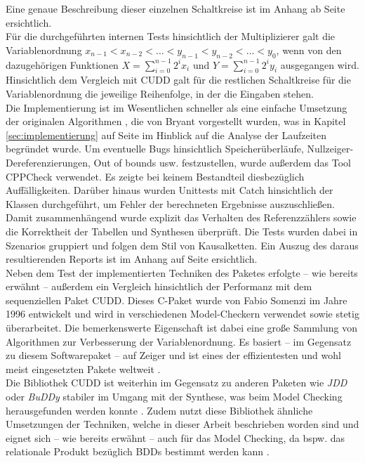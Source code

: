 \noindent 
Eine genaue Beschreibung dieser einzelnen Schaltkreise ist im Anhang ab Seite \pageref{sec:iscas85} ersichtlich.\\
Für die durchgeführten internen Tests hinsichtlich der Multiplizierer galt die Variablenordnung $x_{n-1} < x_{n-2} < \dots < y_{n-1} < y_{n-2} < \dots < y_0$, wenn von den dazugehörigen Funktionen $X = \sum_{i=0}^{n-1}2^ix_i$ und $Y = \sum_{i=0}^{n-1}2^iy_i$ ausgegangen wird. Hinsichtlich dem Vergleich mit CUDD galt für die restlichen Schaltkreise für die Variablenordnung die jeweilige Reihenfolge, in der die Eingaben stehen.\\
Die Implementierung ist im Wesentlichen schneller als eine einfache Umsetzung der originalen Algorithmen \cite{b1986}, die von Bryant vorgestellt wurden, was in Kapitel \ref{sec:implementierung} auf Seite \pageref{sec:implementierung} im Hinblick auf die Analyse der Laufzeiten begründet wurde. Um eventuelle Bugs hinsichtlich Speicherüberläufe, Nullzeiger-Dereferenzierungen, \glqq Out of bounds\grqq{} usw. festzustellen, wurde außerdem das Tool \glqq CPPCheck\grqq{} verwendet. Es zeigte bei keinem Bestandteil diesbezüglich Auffälligkeiten. Darüber hinaus wurden Unittests mit \glqq Catch\grqq{} hinsichtlich der Klassen durchgeführt, um Fehler der berechneten Ergebnisse auszuschließen. Damit zusammenhängend wurde explizit das Verhalten des Referenzzählers sowie die Korrektheit der Tabellen und Synthesen überprüft. Die Tests wurden dabei in Szenarios gruppiert und folgen dem Stil von Kausalketten. Ein Auszug des daraus resultierenden Reports ist im Anhang auf Seite \pageref{sec:unit} ersichtlich.\\
Neben dem Test der implementierten Techniken des Paketes erfolgte -- wie bereits erwähnt -- außerdem ein Vergleich hinsichtlich der Performanz mit dem sequenziellen Paket CUDD. Dieses C-Paket wurde von Fabio Somenzi im Jahre 1996 entwickelt und wird in verschiedenen Model-Checkern verwendet sowie stetig überarbeitet. Die bemerkenswerte Eigenschaft ist dabei eine große Sammlung von Algorithmen zur Verbesserung der Variablenordnung. Es basiert -- im Gegensatz zu diesem Softwarepaket -- auf Zeiger und ist eines der effizientesten und wohl meist eingesetzten Pakete weltweit \cite{j2003}.\\
Die Bibliothek CUDD ist weiterhin im Gegensatz zu anderen Paketen wie \emph{JDD} oder \emph{BuDDy} stabiler im Umgang mit der Synthese, was beim Model Checking herausgefunden werden konnte \cite{rk2017}. Zudem nutzt diese Bibliothek ähnliche Umsetzungen der Techniken, welche in dieser Arbeit beschrieben worden sind und eignet sich -- wie bereits erwähnt -- auch für das Model Checking, da bspw. das relationale Produkt bezüglich BDDs bestimmt werden kann \cite{m1992}.\\
